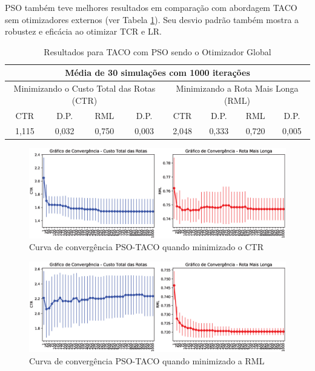 PSO também teve melhores resultados em comparação com abordagem TACO sem otimizadores externos (ver Tabela \ref{tab:resultado-psotaco}). Seu desvio padrão também mostra a robustez e eficácia ao otimizar TCR e LR.

\begin{table}[htb]
    \centering
    \caption{Resultados para TACO com PSO sendo o Otimizador Global} \label{tab:resultado-psotaco}
\begin{tabular}{|c|c|c|c|c|c|c|c|}
\hline
\multicolumn{8}{|c|}{Média de 30 simulações com 1000 iterações}                                                            \\ \hline
\multicolumn{4}{|c|}{Minimizando o Custo Total das Rotas (CTR)} & \multicolumn{4}{c|}{Minimizando a Rota Mais Longa (RML)} \\ \hline
CTR            & D.P.           & RML           & D.P.          & CTR          & D.P.         & RML          & D.P.        \\ \hline
1,115          & 0,032          & 0,750         & 0,003         & 2,048        & 0,333        & 0,720        & 0,005       \\ \hline
\end{tabular}
\end{table}

\begin{figure}[htb]
    \centering
    \caption{Curva de convergência PSO-TACO quando minimizado o CTR} \label{fig:resultados-convergencia-pso-tcr}
    \includegraphics[width=\textwidth]{imagens/convergence-totalcost-psotaco.eps}
\end{figure}

\begin{figure}[htb]
    \centering
    \caption{Curva de convergência PSO-TACO quando minimizado a RML} \label{fig:resultados-convergencia-pso-rml}
    \includegraphics[width=\textwidth]{imagens/convergence-maxcost-psotaco.eps}
\end{figure}


